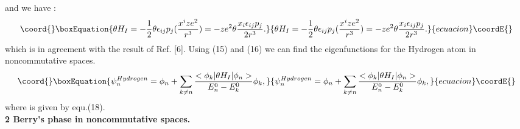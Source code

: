 \documentclass[a4paper,a4paper]{article}
\begin{document}
and we have :
\begin{equation}\coord{}\boxEquation{
\theta H_{I}=-\frac{1}{2}\theta
\epsilon_{ij}p_{j}(\frac{x^{i}ze^{2}}{r^{3}})=-ze^{2}\theta\frac{x_{i}\epsilon_{ij}p_{j}}{2r^{3}}
.
}{
\theta H_{I}=-\frac{1}{2}\theta
\epsilon_{ij}p_{j}(\frac{x^{i}ze^{2}}{r^{3}})=-ze^{2}\theta\frac{x_{i}\epsilon_{ij}p_{j}}{2r^{3}}
.
}{ecuacion}\coordE{}\end{equation}
which is in agreement with the result of Ref. [6]. Using (15) and
(16) we can find the eigenfunctions for the Hydrogen atom in
noncommutative spaces.
\begin{equation}\coord{}\boxEquation{
\psi_{n}^{Hydrogen}=\phi_{n}+ \sum_{k\neq n}\frac{<\phi_{k}|
\theta H_{I}|\phi_{n}>}{E^{0}_{n}-E^{0}_{k}}\phi_{k} ,
}{
\psi_{n}^{Hydrogen}=\phi_{n}+ \sum_{k\neq n}\frac{<\phi_{k}|
\theta H_{I}|\phi_{n}>}{E^{0}_{n}-E^{0}_{k}}\phi_{k} ,
}{ecuacion}\coordE{}\end{equation}
where \coordHE{} is given by equ.(18).\\

\textbf{2 Berry's phase in noncommutative spaces. }\\
\end{document}
